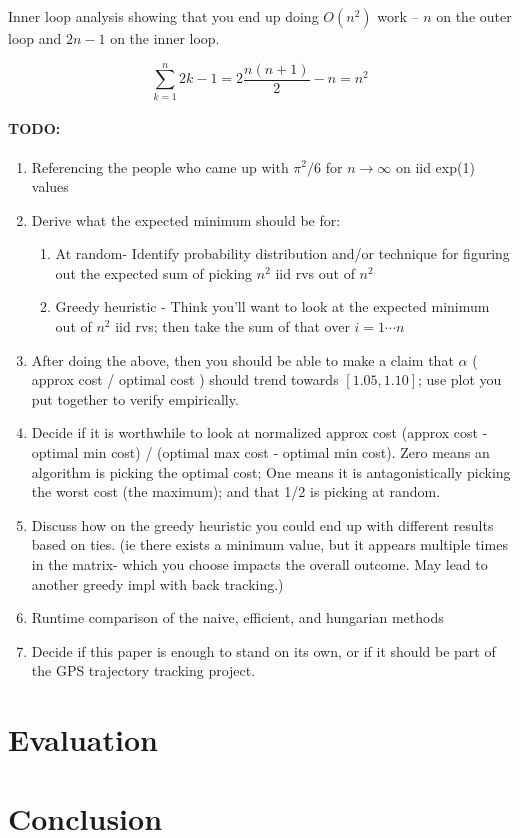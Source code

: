 \documentclass{article}
\begin{document}
Inner loop analysis showing that you end up doing $O(n^2)$ work -- $n$ on the outer loop and $2n - 1$ on the inner loop.

\begin{equation}
	\sum_{k = 1}^{n} 2k - 1 = 2 \frac{n (n + 1)}{2} - n = n^2
\end{equation}

\paragraph{TODO:}

\begin{enumerate}
	\item Referencing the people who came up with $\pi^2/6$ for $n \to \infty$ on iid exp(1) values
	\item Derive what the expected minimum should be for:
	\begin{enumerate}
		\item At random- Identify probability distribution and/or technique for figuring out the expected sum of picking $n^2$ iid rvs out of $n^2$
		\item Greedy heuristic - Think you'll want to look at the expected minimum out of $n^2$ iid rvs; then take the sum of that over $i = 1 \cdots n$
	\end{enumerate}
	\item After doing the above, then you should be able to make a claim that $\alpha$ ( approx cost / optimal cost ) should trend towards $[1.05, 1.10]$; use plot you put together to verify empirically. 
	\item Decide if it is worthwhile to look at normalized approx cost (approx cost - optimal min cost) / (optimal max cost - optimal min cost). Zero means an algorithm is picking the optimal cost; One means it is antagonistically picking the worst cost (the maximum); and that 1/2 is picking at random.
	\item Discuss how on the greedy heuristic you could end up with different results based on ties. (ie there exists a minimum value, but it appears multiple times in the matrix- which you choose impacts the overall outcome. May lead to another greedy impl with back tracking.)
	\item Runtime comparison of the naive, efficient, and hungarian methods

	\item Decide if this paper is enough to stand on its own, or if it should be part of the GPS trajectory tracking project.

\end{enumerate}

\section{Evaluation}

\section{Conclusion}
\end{document}
